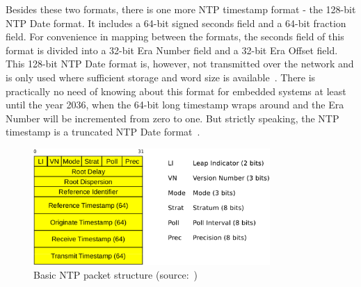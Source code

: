 Besides these two formats, there is one more NTP timestamp format - the 128-bit NTP Date format.
It includes a 64-bit signed seconds field and a 64-bit fraction field.
For convenience in mapping between the formats,
the seconds field of this format is divided into a 32-bit Era Number field
and a 32-bit Era Offset field.
This 128-bit NTP Date format is, however, not transmitted over the network
and is only used where sufficient storage and word size is available~\cite{rfc5905}.
There is practically no need of knowing about this format for embedded systems
at least until the year 2036, when the 64-bit long timestamp wraps around and
the Era Number will be incremented from zero to one.
But strictly speaking, the NTP timestamp is a truncated NTP Date format~\cite{rfc5905}.

\begin{figure}
	\centering
	\includegraphics[width=9cm,keepaspectratio]{fig/ntp-packet.pdf}
	\caption{Basic NTP packet structure (source:~\cite{ntp-arch})}
	\label{fig:ntp-packet}
	\bigskip
\end{figure}

